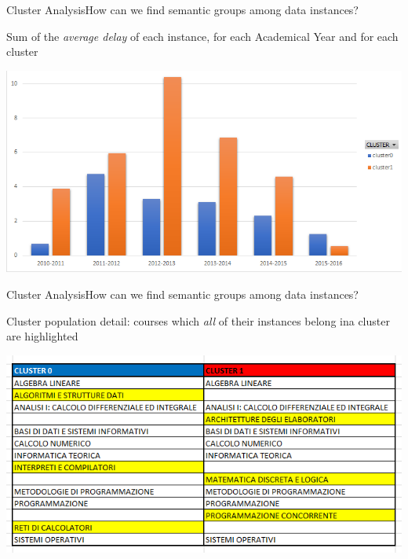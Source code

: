 \begin{frame}{Cluster Analysis}{How can we find semantic groups among data instances?}

    Sum of the \emph{average delay} of each instance, for each Academical Year and for each cluster

    \begin{centering}
        \hspace{0.5cm}\includegraphics[scale=0.40]{cluster4.png}
    \end{centering}

\end{frame}

\begin{frame}{Cluster Analysis}{How can we find semantic groups among data instances?}

    Cluster population detail: courses which \emph{all} of their instances belong ina cluster are highlighted

    \vspace{0.2cm}
    \begin{centering}
        \hspace{0.5cm}\includegraphics[scale=0.40]{../cluster/min_kmeans_2cl_corsi_cluster.png}
    \end{centering}

\end{frame}